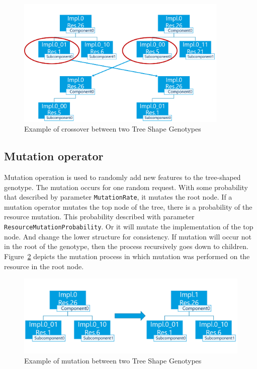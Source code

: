 \begin{figure}
	\centering
	\includegraphics[width=0.9\textwidth]{images/GeneticSolverCrossover.png}
	\caption[Crossover in Tree Shape Genotype]{Example of crossover between two Tree Shape Genotypes}
	\label{fig:GeneticSolverCrossover}
\end{figure}



\subsection{Mutation operator}
\label{sec:GeneticSolverMutation}
Mutation operation is used to randomly add new features to the tree-shaped genotype.
The mutation occurs for one random request. With some probability that described by parameter \texttt{MutationRate}, it mutates the root node. If a mutation operator mutates the top node of the tree, there is a probability of the resource mutation. This probability described with parameter \texttt{ResourceMutationProbability}. Or it will mutate the implementation of the top node. And change the lower structure for consistency. If mutation will occur not in the root of the genotype, then the process recursively goes down to children.  Figure~\ref{fig:GeneticSolverMutation} depicts the mutation process in which mutation was performed on the resource 
in the root node.

\begin{figure}
	\centering
	\includegraphics[width=\textwidth]{images/GeneticSolverMutation.png}
	\caption[Mutation in Tree Shape Genotype]{Example of mutation between two Tree Shape Genotypes}
	\label{fig:GeneticSolverMutation}
\end{figure}

